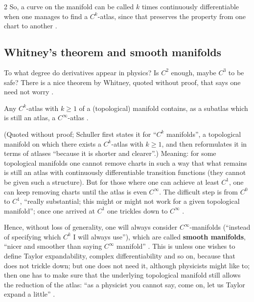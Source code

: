 \begin{paracol}{2}
So, a curve on the manifold can be called $k$ times continuously differentiable when one manages to find a $C^k$-atlas, since that preserves the property from one chart to another .

\subsection{Whitney's theorem and smooth manifolds}

To what degree do derivatives appear in physics? Is $C^2$ enough, maybe $C^3$ to be safe? There is a nice theorem by Whitney, quoted without proof, that says one need not worry .

\begin{theorem}[Whitney]\label{thm:c04-whitney}
Any $C^k$-atlas with $k\ge1$ of a (topological) manifold contains, as a subatlas which is still an atlas, a $C^\infty$-atlas
.
\end{theorem}
(Quoted without proof; Schuller first states it for ``$C^k$ manifolds'', a topological manifold on which there exists a $C^k$-atlas with $k\ge1$, and then reformulates it in terms of atlases ``because it is shorter and clearer''.)
Meaning: for some topological manifolds one cannot remove charts in such a way that what remains is still an atlas with continuously differentiable transition functions (they cannot be given such a structure). But for those where one can achieve at least $C^1$, one can keep removing charts until the atlas is even $C^\infty$.
The difficult step is from $C^0$ to $C^1$, ``really substantial; this might or might not work for a given topological manifold''; once one arrived at $C^1$ one trickles down to $C^\infty$ .

Hence, without loss of generality, one will always consider $C^\infty$-manifolds (``instead of specifying which $C^k$ I will always use''), which are called \textbf{smooth manifolds}, ``nicer and smoother than saying $C^\infty$ manifold'' .
This is unless one wishes to define Taylor expandability, complex differentiability and so on, because that does not trickle down; but one does not need it, although physicists might like to; then one has to make sure that the underlying topological manifold still allows the reduction of the atlas: ``as a physicist you cannot say, come on, let us Taylor expand a little''
.


\end{paracol}
